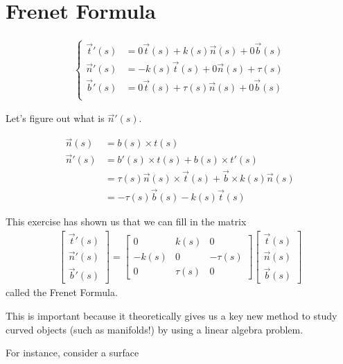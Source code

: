 \documentclass{article}
\begin{document}
\section{Frenet Formula}
\begin{align*}
    \begin{cases}
            \vec{t}'(s) &= 0\vec{t}(s) +k(s) \vec{n}(s) + 0\vec{b}(s) \\
            \vec{n}'(s) &= -k(s)\vec{t}(s) + 0 \vec{n}(s) + \tau(s) \\
            \vec{b}'(s) &= 0 \vec{t}(s) + \tau(s) \vec{n}(s) + 0 \vec{b}(s) \\
    \end{cases}
\end{align*}

Let's figure out what is $\vec{n}'(s)$. 

\begin{align*}
    \vec{n}(s) &= b(s) \times t(s) \\
    \vec{n}'(s) &= b'(s) \times t(s) + b(s) \times t'(s) \\
    &= \tau(s) \vec{n}(s) \times \vec{t}(s) + \vec{b} \times k(s) \vec{n}(s)\\
    &=- \tau(s)\vec{b}(s) - k(s) \vec{t}(s)
\end{align*}

This exercise has shown us that we can fill in the matrix
\begin{align*}
    \begin{bmatrix}
        \vec{t}'(s) \\
        \vec{n}'(s)\\
        \vec{b}'(s)
    \end{bmatrix}
    = 
    \begin{bmatrix}
        0 &k(s) &0\\
        -k(s) &0 &-\tau(s)\\
        0 &\tau(s) &0
    \end{bmatrix}
    \begin{bmatrix}
        \vec{t}(s) \\
        \vec{n}(s)\\
        \vec{b}(s)
    \end{bmatrix}
\end{align*}
called the Frenet Formula. 

This is important because it theoretically gives us a key new method to study curved objects (such as manifolds!) by using a linear algebra problem.

For instance, consider a surface
\end{document}
